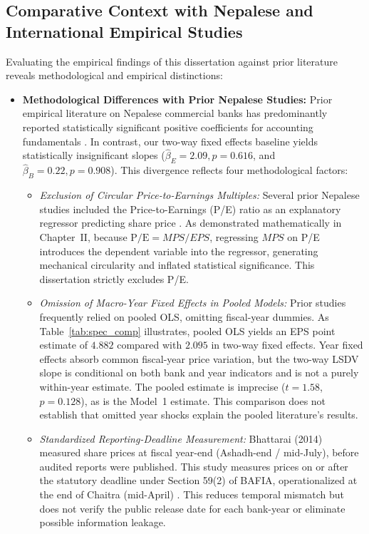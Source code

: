 \subsection{Comparative Context with Nepalese and International Empirical Studies}
Evaluating the empirical findings of this dissertation against prior literature reveals methodological and empirical distinctions:
\begin{itemize}
    \item \textbf{Methodological Differences with Prior Nepalese Studies:}
    Prior empirical literature on Nepalese commercial banks has predominantly reported statistically significant positive coefficients for accounting fundamentals \citep{bhattarai2014,joshi2023}. In contrast, our two-way fixed effects baseline yields statistically insignificant slopes ($\hat{\beta}_E = 2.09, p = 0.616$, and $\hat{\beta}_B = 0.22, p = 0.908$). This divergence reflects four methodological factors:
    \begin{itemize}
        \item \textit{Exclusion of Circular Price-to-Earnings Multiples:} Several prior Nepalese studies included the Price-to-Earnings (P/E) ratio as an explanatory regressor predicting share price \citep{bhattarai2014,chhetri2023,giri2024,joshi2023,pant2024}. As demonstrated mathematically in Chapter~II, because $\text{P/E} = \mathit{MPS} / \mathit{EPS}$, regressing $\mathit{MPS}$ on P/E introduces the dependent variable into the regressor, generating mechanical circularity and inflated statistical significance. This dissertation strictly excludes P/E.
        \item \textit{Omission of Macro-Year Fixed Effects in Pooled Models:} Prior studies frequently relied on pooled OLS, omitting fiscal-year dummies. As Table~\ref{tab:spec_comp} illustrates, pooled OLS yields an EPS point estimate of $4.882$ compared with $2.095$ in two-way fixed effects. Year fixed effects absorb common fiscal-year price variation, but the two-way LSDV slope is conditional on both bank and year indicators and is not a purely within-year estimate. The pooled estimate is imprecise ($t=1.58$, $p=0.128$), as is the Model~1 estimate. This comparison does not establish that omitted year shocks explain the pooled literature's results.
        \item \textit{Standardized Reporting-Deadline Measurement:} Bhattarai (2014) measured share prices at fiscal year-end (Ashadh-end / mid-July), before audited reports were published. This study measures prices on or after the statutory deadline under Section 59(2) of BAFIA, operationalized at the end of Chaitra (mid-April) \citep{bafia2017}. This reduces temporal mismatch but does not verify the public release date for each bank-year or eliminate possible information leakage.

\end{itemize}
\end{itemize}
